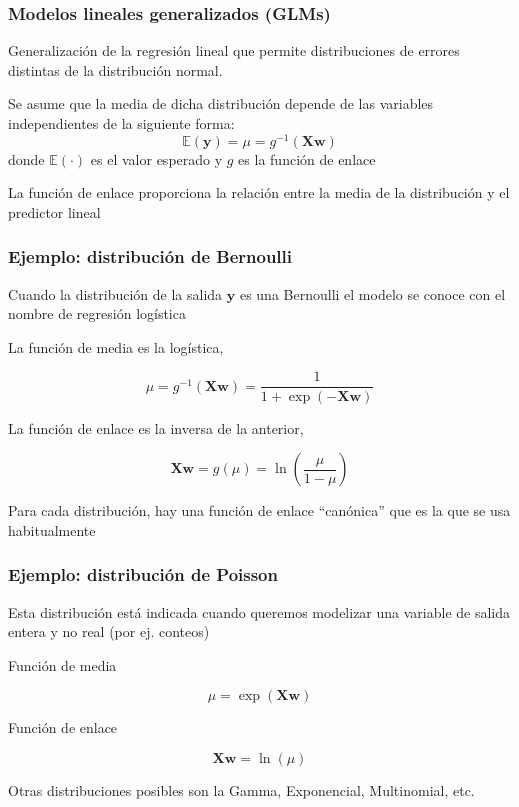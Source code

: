 \documentclass{beamer}
\newcommand{\Xbf}{\ensuremath{\mathbf{X}}}
\newcommand{\wbf}{\ensuremath{\mathbf{w}}}
\newcommand{\ybf}{\ensuremath{\mathbf{y}}}
\newcommand{\Ebb}{\ensuremath{\mathbb{E}}}
\newenvironment{wideitemize}{\itemize\addtolength{\itemsep}{12pt}}{\enditemize}
\begin{document}
\begin{frame}
\frametitle{Modelos lineales generalizados (GLMs)}

\begin{wideitemize}
\item Generalización de la regresión lineal que permite distribuciones de errores distintas de la distribución normal.

\item Se asume que la media de dicha distribución depende de las variables independientes de la siguiente forma:
$$\Ebb(\ybf) = \mu = g^{-1}(\Xbf\wbf)$$
donde $\Ebb(\cdot)$ es el valor esperado y $g$ es la función de enlace

\item La función de enlace proporciona la relación entre la media de la distribución y el predictor lineal
\end{wideitemize}
\end{frame}


\begin{frame}
\frametitle{Ejemplo: distribución de Bernoulli}

\begin{wideitemize}
\item Cuando la distribución de la salida $\ybf$ es una Bernoulli el modelo se conoce con el nombre de regresión logística

\item La función de media es la logística,

$$\mu = g^{-1}(\Xbf\wbf) = \frac{1}{1 + \exp(-\Xbf\wbf)}$$

\item La función de enlace es la inversa de la anterior,

$$\Xbf\wbf = g(\mu) = \ln\left(\frac{\mu}{1 - \mu}\right)$$

\item Para cada distribución, hay una función de enlace ``canónica'' que es la que se usa habitualmente
\end{wideitemize}

\end{frame}


\begin{frame}
\frametitle{Ejemplo: distribución de Poisson}

\begin{wideitemize}
\item Esta distribución está indicada cuando queremos modelizar una variable de salida entera y no real (por ej. conteos)

\item Función de media

$$\mu = \exp(\Xbf\wbf)$$

\item Función de enlace

$$\Xbf\wbf = \ln(\mu)$$

\item Otras distribuciones posibles son la Gamma, Exponencial, Multinomial, etc.
\end{wideitemize}
\end{frame}
\end{document}
